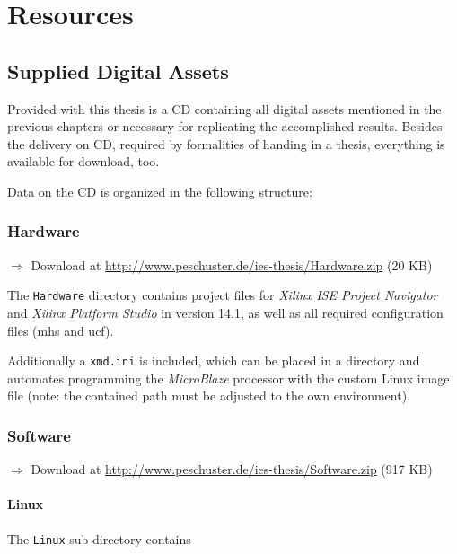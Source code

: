 \chapter{Resources}

\section{Supplied Digital Assets}

Provided with this thesis is a CD containing all digital assets mentioned in the previous chapters or necessary for replicating the accomplished results. Besides the delivery on CD, required by formalities of handing in a thesis, everything is available for download, too.

Data on the CD is organized in the following structure:

\subsection{Hardware}
$\Rightarrow$ Download at \url{http://www.peschuster.de/ies-thesis/Hardware.zip} (20 KB)

The \texttt{Hardware} directory contains project files for \textit{Xilinx ISE Project Navigator} and \textit{Xilinx Platform Studio} in version 14.1, as well as all required configuration files (mhs and ucf).

Additionally a \texttt{xmd.ini} is included, which can be placed in a directory and automates programming the \textit{MicroBlaze} processor with the custom Linux image file (note: the contained path must be adjusted to the own environment).
\\

\subsection{Software}
$\Rightarrow$ Download at \url{http://www.peschuster.de/ies-thesis/Software.zip} (917 KB)

\subsubsection{Linux}
\label{subsec:pvr_patch}

The \texttt{Linux} sub-directory contains 

